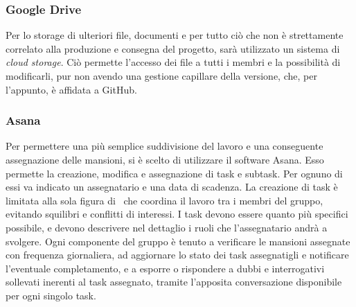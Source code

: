 		\subsubsection{Google Drive}
		Per lo storage di ulteriori file, documenti e per tutto ciò che non è strettamente correlato alla produzione e consegna del progetto, sarà utilizzato un sistema di \textit{cloud storage}. Ciò permette l'accesso dei file a tutti i membri e la possibilità di modificarli, pur non avendo una gestione capillare della versione, che, per l'appunto, è affidata a GitHub.

		\subsubsection{Asana}
		Per permettere una più semplice suddivisione del lavoro e una conseguente assegnazione delle mansioni, si è scelto di utilizzare il software Asana. Esso permette la creazione, modifica e assegnazione di task e subtask. Per ognuno di essi va indicato un assegnatario e una data di scadenza. La creazione di task è limitata alla sola figura di \RdP\, che coordina il lavoro tra i membri del gruppo, evitando squilibri e conflitti di interessi. I task devono essere quanto più specifici possibile, e devono descrivere nel dettaglio i ruoli che l'assegnatario andrà a svolgere. Ogni componente del gruppo è tenuto a verificare le mansioni assegnate con frequenza giornaliera, ad aggiornare lo stato dei task assegnatigli e notificare l'eventuale completamento, e a esporre o rispondere a dubbi e interrogativi sollevati inerenti al task assegnato, tramite l'apposita conversazione disponibile per ogni singolo task.